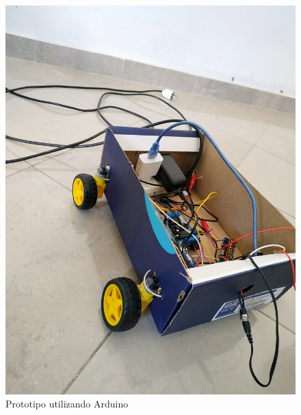\begin{figure}[H]
	\centering
	\includegraphics[width=0.9\linewidth]{imagenes/ensayo2.jpg}
	\caption{Prototipo utilizando Arduino}
	\label{fig:ensayo2}
\end{figure}

